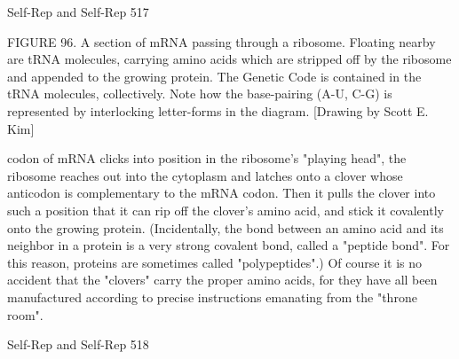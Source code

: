 {Self-Rep and Self-Rep                                                                        517

FIGURE 96. A section of mRNA passing through a ribosome. Floating nearby are tRNA
molecules, carrying amino acids which are stripped off by the ribosome and appended to the
growing protein. The Genetic Code is contained in the tRNA molecules, collectively. Note
how the base-pairing (A-U, C-G) is represented by interlocking letter-forms in the diagram.
[Drawing by Scott E. Kim]

codon of mRNA clicks into position in the ribosome's "playing head", the ribosome reaches
out into the cytoplasm and latches onto a clover whose anticodon is complementary to the
mRNA codon. Then it pulls the clover into such a position that it can rip off the clover's
amino acid, and stick it covalently onto the growing protein. (Incidentally, the bond between
an amino acid and its neighbor in a protein is a very strong covalent bond, called a "peptide
bond". For this reason, proteins are sometimes called "polypeptides".) Of course it is no
accident that the "clovers" carry the proper amino acids, for they have all been manufactured
according to precise instructions emanating from the "throne room".




Self-Rep and Self-Rep                                                                    518

}
